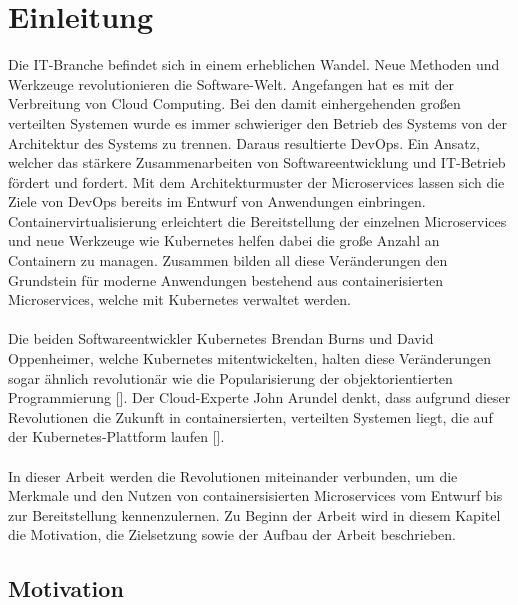 \section{Einleitung}

\vspace{1em} 

Die IT-Branche befindet sich in einem erheblichen Wandel. Neue Methoden und Werkzeuge revolutionieren die Software-Welt. Angefangen hat es mit der Verbreitung von Cloud Computing. Bei den damit einhergehenden großen verteilten Systemen wurde es immer schwieriger den Betrieb des Systems von der Architektur des Systems zu trennen. Daraus resultierte DevOps. Ein Ansatz, welcher das stärkere Zusammenarbeiten von Softwareentwicklung und IT-Betrieb fördert und fordert. Mit dem Architekturmuster der Microservices lassen sich die Ziele von DevOps bereits im Entwurf von Anwendungen einbringen. Containervirtualisierung erleichtert die Bereitstellung der einzelnen Microservices und neue Werkzeuge wie Kubernetes helfen dabei die große Anzahl an Containern zu managen. Zusammen bilden all diese Veränderungen den Grundstein für moderne Anwendungen bestehend aus containerisierten Microservices, welche mit Kubernetes verwaltet werden. \\
\\
Die beiden Softwareentwickler Kubernetes Brendan Burns und David Oppenheimer, welche Kubernetes mitentwickelten, halten diese Veränderungen sogar ähnlich revolutionär wie die Popularisierung der objektorientierten Programmierung [\cite[S. 1]{burnsDesign2016}]. Der Cloud-Experte John Arundel denkt, dass aufgrund dieser Revolutionen die Zukunft in containersierten, verteilten Systemen liegt, die auf der Kubernetes-Plattform laufen [\cite[S. 1]{arundelCloud2019}]. \\
\\
In dieser Arbeit werden die Revolutionen miteinander verbunden, um die Merkmale und den Nutzen von containersisierten Microservices vom Entwurf bis zur Bereitstellung kennenzulernen. Zu Beginn der Arbeit wird in diesem Kapitel die Motivation, die Zielsetzung sowie der Aufbau der Arbeit beschrieben.

\subsection{Motivation}

